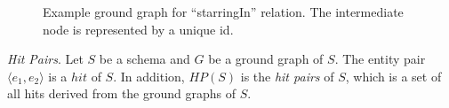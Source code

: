 \begin{figure}[th]
\centering
\caption{Example ground graph for ``starringIn'' relation. The intermediate node is represented by a unique id.}
\label{fig:ground-graph}
\end{figure}

\begin{definition}
\textit{Hit Pairs}. Let $S$ be a schema and $G$ be a ground graph of $S$. The entity pair $\langle e_1, e_2 \rangle$
is a $hit$ of $S$. 
In addition, $HP(S)$ is the \textit{hit pairs} of $S$,
which is a set of all hits derived from the ground graphs of $S$.
\end{definition}


